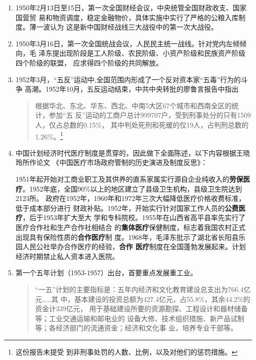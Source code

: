 \begin{enumerate}

\item 1950年2月13日至15日，第一次全国财经会议，中央统管全国财政收支、国家国营贸
  易和物资调度，稳定金融物价，具体实施中实行了严格的公粮入库制度。薄一波认为
  这是新中国财经战线三大战役中的第一次大战役。

\item 1950年3月16日，第一次全国统战会议，人民民主统一战线。针对党内左倾倾向，毛
  泽东提出现阶段是工人阶级、农民阶级、小资产阶级和民族资产阶级四个阶级的联盟，
  应求得四个阶级的共同解放。

\item 1952年3月，“五反”运动中,全国范围内形成了一个反对资本家“五毒”行为的斗争
  高潮。1952年10月，五反运动结束，中共中央转批的廖鲁言报告中指出
  \begin{quotation}
    根据华北、东北、华东、西北、中南5大区67个城市和西南全区的统计，参加“五
    反”运动的工商户总计999707户，受到刑事处分的只有1509人，仅占总数的0.15\%，
    其中判处死刑和死缓的仅19人，占判刑总数的1.26\%。\footnote{这份报告未提受
    到非刑事处罚的人数、比例，以及对他们的惩罚措施。}
  \end{quotation}

\item 中国计划经济时代医疗制度是贯穿的，因此做下全面陈述，以下内容根据王晓玲所作论文
  《中国医疗市场政府管制的历史演进及制度反思》\cite{yiliaoshi}：

  1951年起开始对工商业职工及其供养的直系家属实行源自企业纯收入的\textbf{劳保医
    疗}。1952年底，全国90\%以上的地区建立了县级卫生机构，县级卫生院达到2123所。
  政府在1952年，1960年和1972年三次大幅降低医疗价格收费标准，低于成本部分进行
  财政补贴。1952年，开始实行针对国家工作人员的\textbf{公费医疗}，后于1953年扩大至大
  学和专科院校。1955年在山西省高平县率先实行了医疗合作社和生产合作社相结合
  的\textbf{集体医疗}保健制度，标志着我国农村正式出现具有保险性质的\textbf{合作医疗}制
  度。1968年，毛泽东批示了湖北省长阳县乐园人民公社举办合作医疗的经验，\textbf{合作
    医疗}制度在全国蓬勃发展起来。计划经济时期禁止私人资本进入医院。


\item 第一个五年计划（1953-1957）出台，首要重点发展重工业。
  \begin{quotation}
    “一五”计划的主要指标是：五年内经济和文化教育建设总支出为766.4亿元……其
    中，基本建设的投资总额为427.4亿元，占55.8\%，其余44.2\%的资金计339亿元，
    用于基础建设所要的资源勘探、工程设计和器材储备等；工业交通运输和邮电业的
    设备大修、技术组织措施、新产品试制等；各经济部门的流通资金；经济和文化事
    业，培养专业干部等。


\end{quotation}
\end{enumerate}
